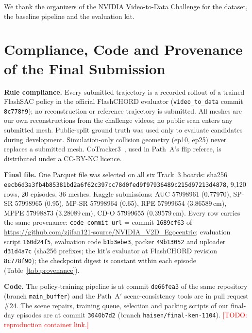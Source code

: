 \documentclass[10pt]{nvidiaextabstract}
\newcommand{\todo}[1]{\textcolor{red}{[TODO: #1]}}
\begin{document}
\begin{acks}
We thank the organizers of the NVIDIA Video-to-Data Challenge for the dataset, the baseline pipeline and the evaluation kit.
\end{acks}




\clearpage
\appendix
\onecolumn

\section{Compliance, Code and Provenance of the Final Submission}
\label{app:prov}

\textbf{Rule compliance.} Every submitted trajectory is a recorded rollout of a trained FlashSAC policy in the official FlashCHORD evaluator (\texttt{video\_to\_data} commit \texttt{8c778f9}); no reconstruction or reference trajectory is submitted. All meshes are our own reconstructions from the challenge videos; no public scan enters any submitted mesh. Public-split ground truth was used only to evaluate candidates during development. Simulation-only collision geometry (ep10, ep25) never replaces a submitted mesh. CoTracker3~\cite{karaev2025cotracker3}, used in Path~A's flip referee, is distributed under a CC-BY-NC licence.

\textbf{Final file.} One Parquet file was selected on all six Track~3 boards: sha256 \texttt{eecb6d3a3fb4b853\allowbreak 81bd2a6f62c397cc\allowbreak 78d0fed9f9793648\allowbreak 9c215d97213d4878}, 9{,}120 rows, 20 episodes, 36 meshes. Kaggle submissions: AUC 57998961 (0.77970), SP-SR 57998965 (0.95), MP-SR 57998964 (0.65), RPE 57999654 (3.86589\,cm), MPPE 57998873 (3.28089\,cm), CD-O 57999655 (0.39579\,cm). Every row carries the same provenance: \texttt{code\_commit\_url} = commit \texttt{1689cf63} of \url{https://github.com/zjifan121-source/NVIDIA_V2D_Egocentric}; evaluation script \texttt{160d24f5}, evaluation code \texttt{b1b3ebe3}, packer \texttt{49b13052} and uploader \texttt{d31d4a7c} (sha256 prefixes; the kit's evaluator at FlashCHORD revision \texttt{8c778f90}); the checkpoint digest is constant within each episode (Table~\ref{tab:provenance}).

\textbf{Code.} The policy-training pipeline is at commit \texttt{de66fea3} of the same repository (branch \texttt{main\_buffer}) and the Path~A$'$ scene-consistency tools are in pull request \#24. The scene repairs, training queue, selection and packing scripts of our final-day episodes are at commit \texttt{3040b7d2} (branch \texttt{haisen/final-ken-1104}). \todo{reproduction container link.}
\end{document}
